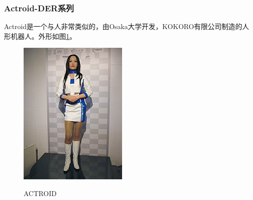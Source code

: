\documentclass[10pt,a4paper]{article}
\begin{document}
\begin{CJK*}{UTF8}{gkai}
\subsubsection{Actroid-DER系列}
Actroid是一个与人非常类似的，由Osaka大学开发，KOKORO有限公司制造的人形机器人。外形如图\ref{fig:actroid}。\\
\begin{figure}[!htbp]
	\centering
	\caption{ACTROID}  
		\includegraphics[scale=0.35]{figs/Actroid.jpg}
    	\label{fig:actroid}
\end{figure}



		
		

\clearpage     
\end{CJK*}
\end{document}
